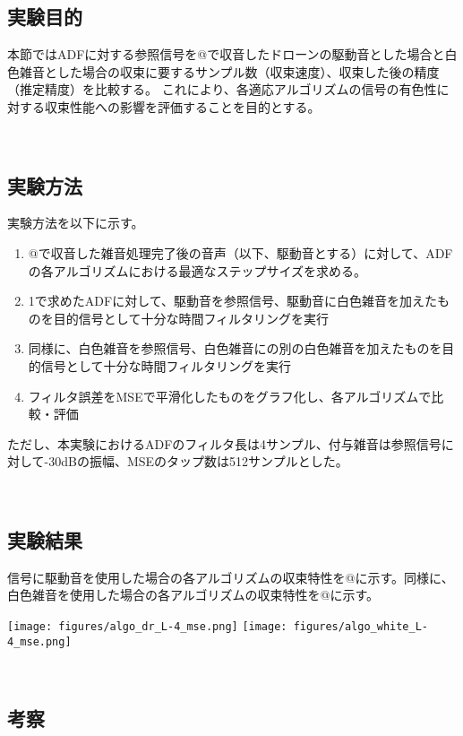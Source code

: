 \subsection{実験目的}\label{purpose-color}

本節ではADFに対する参照信号を@で収音したドローンの駆動音とした場合と白色雑音とした場合の収束に要するサンプル数（収束速度）、収束した後の精度（推定精度）を比較する。
これにより、各適応アルゴリズムの信号の有色性に対する収束性能への影響を評価することを目的とする。

\
\subsection{実験方法}\label{instruction-color}

実験方法を以下に示す。

\begin{enumerate}
\renewcommand{\labelenumi}{(\arabic{enumi})}
\tightlist
\item
  @で収音した雑音処理完了後の音声（以下、駆動音とする）に対して、ADFの各アルゴリズムにおける最適なステップサイズを求める。
\item
  1で求めたADFに対して、駆動音を参照信号、駆動音に白色雑音を加えたものを目的信号として十分な時間フィルタリングを実行
\item
  同様に、白色雑音を参照信号、白色雑音にの別の白色雑音を加えたものを目的信号として十分な時間フィルタリングを実行
\item
  フィルタ誤差をMSEで平滑化したものをグラフ化し、各アルゴリズムで比較・評価
\end{enumerate}

ただし、本実験におけるADFのフィルタ長は4サンプル、付与雑音は参照信号に対して-30dBの振幅、MSEのタップ数は512サンプルとした。

\
\subsection{実験結果}\label{result-color}

信号に駆動音を使用した場合の各アルゴリズムの収束特性を@に示す。同様に、白色雑音を使用した場合の各アルゴリズムの収束特性を@に示す。

\texttt{[image: figures/algo\_dr\_L-4\_mse.png]}
\texttt{[image: figures/algo\_white\_L-4\_mse.png]}

\
\subsection{考察}\label{consideration-color}

